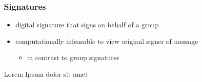 \begin{frame}
	\frametitle{Signatures}

	\begin{definition}
		\begin{itemize}
			\item digital signature that signs on behalf of a group
			\item computationally infeasable to view original signer of message
				\begin{itemize}
					\item in contrast to group signatures
				\end{itemize}
		\end{itemize}
	\end{definition}
	\begin{definition}
		Lorem Ipsum dolor sit amet
	\end{definition}
\end{frame}